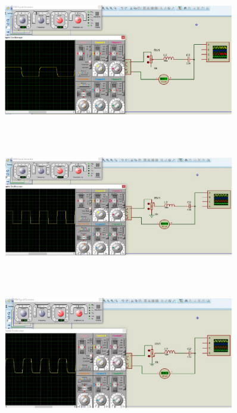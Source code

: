 \documentclass[12pt]{article}
\begin{document}
\begin{figure}[H]
\begin{center}
\includegraphics[width=0.9\textwidth, height=6cm]{./images/6.3.a.1}
\end{center}
\end{figure}
\begin{figure}[H]
\begin{center}
\includegraphics[width=0.9\textwidth, height=6cm]{./images/6.3.a.2}
\end{center}
\end{figure}
\begin{figure}[H]
\begin{center}
\includegraphics[width=0.9\textwidth, height=6cm]{./images/6.3.a.3}
\end{center}
\end{figure}
\end{document}
